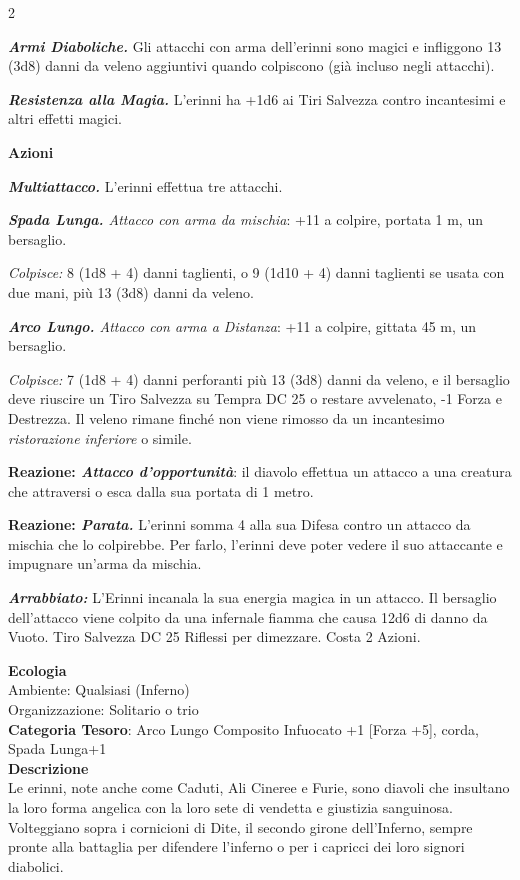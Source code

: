 \begin{multicols}{2}
{\emph{\textbf{Armi Diaboliche.}} Gli attacchi con arma dell'erinni sono magici e infliggono 13 (3d8) danni da veleno aggiuntivi quando colpiscono (già incluso negli attacchi).

\emph{\textbf{Resistenza alla Magia.}} L'erinni ha +1d6 ai Tiri Salvezza contro incantesimi e altri effetti magici.

\textbf{Azioni}

\emph{\textbf{Multiattacco.}} L'erinni effettua tre attacchi.

\emph{\textbf{Spada Lunga.} Attacco con arma da mischia}: +11 a colpire, portata 1 m, un bersaglio.

\emph{Colpisce:} 8 (1d8 + 4) danni taglienti, o 9 (1d10 + 4) danni taglienti se usata con due mani, più 13 (3d8) danni da veleno.

\emph{\textbf{Arco Lungo.} Attacco con arma a Distanza}: +11 a colpire, gittata 45 m, un bersaglio.

\emph{Colpisce:} 7 (1d8 + 4) danni perforanti più 13 (3d8) danni da veleno, e il bersaglio deve riuscire un Tiro Salvezza su Tempra DC 25 o restare avvelenato, -1 Forza e Destrezza. Il veleno rimane finché non viene rimosso da un incantesimo \emph{ristorazione inferiore} o simile.

\textbf{Reazione: \emph{Attacco d'opportunità}}: il diavolo effettua un attacco a una creatura che attraversi o esca dalla sua portata di 1 metro.

\textbf{Reazione: \emph{Parata.}} L'erinni somma 4 alla sua Difesa contro un attacco da mischia che lo colpirebbe. Per farlo, l'erinni deve poter vedere il suo attaccante e impugnare un'arma da mischia.

\emph{\textbf{Arrabbiato:}} L'Erinni incanala la sua energia magica in un attacco. Il bersaglio dell'attacco viene colpito da una infernale fiamma che causa 12d6 di danno da Vuoto. Tiro Salvezza DC 25 Riflessi per dimezzare. Costa 2 Azioni.

\textbf{Ecologia}\\
Ambiente: Qualsiasi (Inferno)\\
Organizzazione: Solitario o trio\\
\textbf{Categoria Tesoro}: Arco Lungo Composito Infuocato +1 [Forza +5], corda, Spada Lunga+1\\
\textbf{Descrizione}\\
Le erinni, note anche come Caduti, Ali Cineree e Furie, sono diavoli che insultano la loro forma angelica con la loro sete di vendetta e giustizia sanguinosa. Volteggiano sopra i cornicioni di Dite, il secondo girone dell'Inferno, sempre pronte alla battaglia per difendere l'inferno o per i capricci dei loro signori diabolici.

}
\end{multicols}
